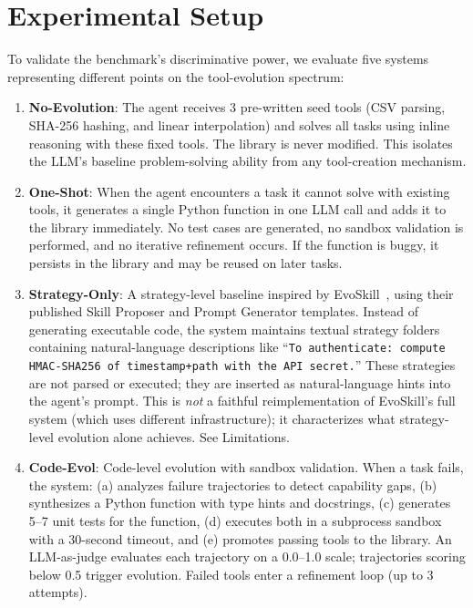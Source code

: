 \documentclass[sigconf,anonymous,review,natbib=false]{acmart}
\begin{document}
\section{Experimental Setup}
\label{sec:exp_setup}

To validate the benchmark's discriminative power, we evaluate five systems representing different points on the tool-evolution spectrum:

\begin{enumerate}
\item \textbf{No-Evolution}: The agent receives 3 pre-written seed tools (CSV parsing, SHA-256 hashing, and linear interpolation) and solves all tasks using inline reasoning with these fixed tools. The library is never modified. This isolates the LLM's baseline problem-solving ability from any tool-creation mechanism.

\item \textbf{One-Shot}: When the agent encounters a task it cannot solve with existing tools, it generates a single Python function in one LLM call and adds it to the library immediately. No test cases are generated, no sandbox validation is performed, and no iterative refinement occurs. If the function is buggy, it persists in the library and may be reused on later tasks.

\item \textbf{Strategy-Only}: A strategy-level baseline inspired by EvoSkill~\cite{alzubi2026evoskill}, using their published Skill Proposer and Prompt Generator templates. Instead of generating executable code, the system maintains textual strategy folders containing natural-language descriptions like ``\texttt{To authenticate: compute HMAC-SHA256 of timestamp+path with the API secret.}'' These strategies are not parsed or executed; they are inserted as natural-language hints into the agent's prompt. This is \emph{not} a faithful reimplementation of EvoSkill's full system (which uses different infrastructure); it characterizes what strategy-level evolution alone achieves. See Limitations.

\item \textbf{Code-Evol}: Code-level evolution with sandbox validation. When a task fails, the system: (a) analyzes failure trajectories to detect capability gaps, (b) synthesizes a Python function with type hints and docstrings, (c) generates 5--7 unit tests for the function, (d) executes both in a subprocess sandbox with a 30-second timeout, and (e) promotes passing tools to the library. An LLM-as-judge evaluates each trajectory on a 0.0--1.0 scale; trajectories scoring below 0.5 trigger evolution. Failed tools enter a refinement loop (up to 3 attempts).


\end{enumerate}
\end{document}

